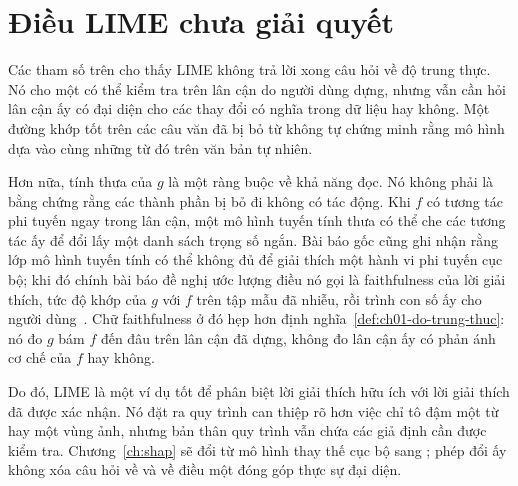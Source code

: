 \section{Điều LIME chưa giải quyết}
\label{sec:ch03-dieu-lime-chua-giai-quyet}

Các tham số trên cho thấy LIME không trả lời xong câu hỏi về độ trung thực. Nó
cho một  có thể kiểm tra trên lân cận do người dùng dựng, nhưng
vẫn cần hỏi lân cận ấy có đại diện cho các thay đổi có nghĩa trong dữ liệu hay
không. Một đường khớp tốt trên các câu văn đã bị bỏ từ không tự chứng minh rằng
mô hình dựa vào cùng những từ đó trên văn bản tự nhiên.

Hơn nữa, tính thưa của $g$ là một ràng buộc về khả năng đọc. Nó không phải là bằng
chứng rằng các thành phần bị bỏ đi không có tác động. Khi $f$ có tương tác
phi tuyến ngay trong lân cận, một mô hình tuyến tính thưa có thể che các tương
tác ấy để đổi lấy một danh sách trọng số ngắn. Bài báo gốc cũng ghi nhận rằng
lớp mô hình tuyến tính có thể không đủ để giải thích một hành vi phi tuyến cục
bộ; khi đó chính bài báo đề nghị ước lượng điều nó gọi là faithfulness của lời
giải thích, tức độ khớp của $g$ với $f$ trên tập mẫu đã nhiễu, rồi trình con
số ấy cho người dùng~\autocite{p09lime}. Chữ faithfulness ở đó hẹp hơn
định nghĩa~\ref{def:ch01-do-trung-thuc}: nó đo $g$ bám $f$ đến đâu trên lân
cận đã dựng, không đo lân cận ấy có phản ánh cơ chế của $f$ hay không.

Do đó, LIME là một ví dụ tốt để phân biệt lời giải thích hữu ích với lời giải
thích đã được xác nhận. Nó đặt ra quy trình can thiệp rõ hơn việc chỉ tô đậm
một từ hay một vùng ảnh, nhưng bản thân quy trình vẫn chứa các giả định cần
được kiểm tra. Chương~\ref{ch:shap} sẽ đổi từ mô hình thay thế cục bộ sang
; phép đổi ấy không xóa câu hỏi về
 và về điều một
đóng góp thực sự đại diện.

%

